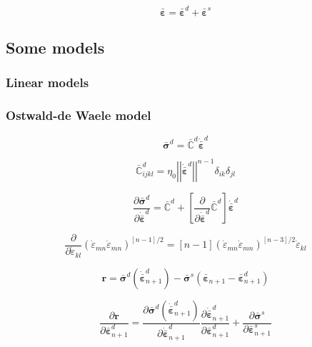 \documentclass[12pt]{article}
\newcommand{\pder}[2]{\dfrac{\partial #1}{\partial #2}}
\begin{document}
\begin{equation}
	\bar{\bm{\varepsilon}} = \bar{\bm{\varepsilon}}^{d} +   \bar{\bm{\varepsilon}}^{s} 
\end{equation}


\subsection{Some models}

\subsubsection{Linear models}


\subsubsection{Ostwald-de Waele model}

\begin{equation}
	\bar{\bm{\sigma}}^{d} = \bar{\mathbb{C}}^{d}\dot{\bar{\bm{\varepsilon}}}^{d}
\end{equation}

\begin{equation}
	 \bar{\mathbb{C}}^{d}_{ijkl} = \eta_{0} \left|\left|\dot{\bar{\bm{\varepsilon}}}^{d}\right|\right|^{n-1} \delta_{ik}\delta_{jl}
\end{equation}

\begin{equation}
	\pder{\bar{\bm{\sigma}}^{d}}{\dot{\bar{\bm{\varepsilon}}}^{d}} = \bar{\mathbb{C}}^{d} + \left[\pder{ }{\dot{\bar{\bm{\varepsilon}}}^{d}} \bar{\mathbb{C}}^{d}\right]\dot{\bar{\bm{\varepsilon}}}^{d}
\end{equation}

\begin{equation}
	\pder{ }{\dot{\varepsilon}_{kl}}\left(\dot{\varepsilon}_{mn}\dot{\varepsilon}_{mn}\right)^{\left[n-1\right]/2} = \left[n-1\right]\left(\dot{\varepsilon}_{mn}\dot{\varepsilon}_{mn}\right)^{\left[n-3\right]/2}\dot{\varepsilon}_{kl}
\end{equation}

\begin{equation}
	\bm{r} = \bar{\bm{\sigma}}^{d}\left(\dot{\bar{\bm{\varepsilon}}}_{n+1}^{d}\right) - \bar{\bm{\sigma}}^{s}(\bar{\bm{\varepsilon}}_{n+1} - \bar{\bm{\varepsilon}}_{n+1}^{d})  
\end{equation}

\begin{equation}
	\pder{\bm{r}}{\bar{\bm{\varepsilon}}_{n+1}^{d}} = \pder{\bar{\bm{\sigma}}^{d}\left(\dot{\bar{\bm{\varepsilon}}}_{n+1}^{d}\right)}{\dot{\bar{\bm{\varepsilon}}}_{n+1}^{d}}\pder{\dot{\bar{\bm{\varepsilon}}}_{n+1}^{d}}{\bar{\bm{\varepsilon}}_{n+1}^{d}} + \pder{\bar{\bm{\sigma}}^{s}}{\bar{\bm{\varepsilon}}_{n+1}^{s}}
\end{equation}
\end{document}
